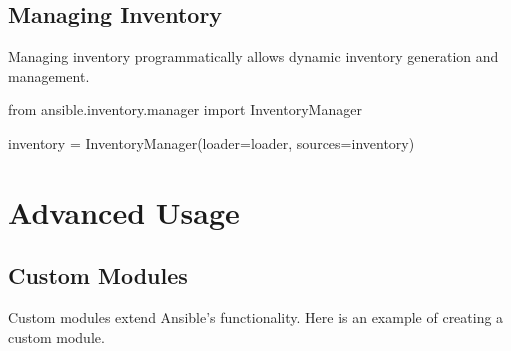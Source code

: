 \documentclass[
  letterpaper,
  DIV=11,
  numbers=noendperiod]{scrreprt}
\newenvironment{Shaded}{\begin{snugshade}}{\end{snugshade}}
\newcommand{\ImportTok}[1]{\textcolor[rgb]{0.00,0.46,0.62}{#1}}
\newcommand{\NormalTok}[1]{\textcolor[rgb]{0.00,0.23,0.31}{#1}}
\newcommand{\OperatorTok}[1]{\textcolor[rgb]{0.37,0.37,0.37}{#1}}
\newcommand{\StringTok}[1]{\textcolor[rgb]{0.13,0.47,0.30}{#1}}
\begin{document}
\subsection{Managing Inventory}\label{managing-inventory}

Managing inventory programmatically allows dynamic inventory generation
and management.

\begin{Shaded}
\begin{Highlighting}[]
\ImportTok{from}\NormalTok{ ansible.inventory.manager }\ImportTok{import}\NormalTok{ InventoryManager}

\NormalTok{inventory }\OperatorTok{=}\NormalTok{ InventoryManager(loader}\OperatorTok{=}\NormalTok{loader, sources}\OperatorTok{=}\StringTok{\textquotesingle{}inventory\textquotesingle{}}\NormalTok{)}
\end{Highlighting}
\end{Shaded}

\section{Advanced Usage}\label{advanced-usage-3}

\subsection{Custom Modules}\label{custom-modules}

Custom modules extend Ansible's functionality. Here is an example of
creating a custom module.
\end{document}
